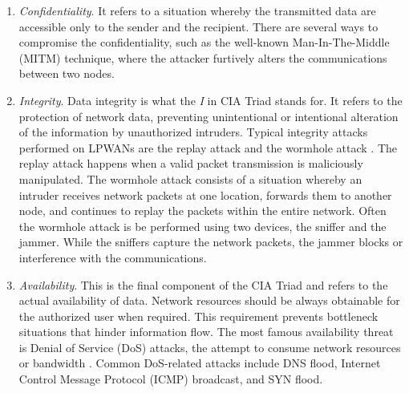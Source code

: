 \begin{enumerate}
	\item \textit{Confidentiality}. It refers to a situation whereby the transmitted data are accessible only to the sender and the recipient. There are several ways to compromise the confidentiality, such as the well-known Man-In-The-Middle (MITM) technique, where the attacker furtively alters the communications between two nodes.
	\item \textit{Integrity}. Data integrity is what the \textit{I} in CIA Triad stands for. It refers to the protection of network data, preventing unintentional or intentional alteration of the information by unauthorized intruders. Typical integrity attacks performed on LPWANs are the replay attack and the wormhole attack \cite{Chacko_2018}. The replay attack happens when a valid packet transmission is maliciously manipulated. The wormhole attack consists of a situation whereby an intruder receives network packets at one location, forwards them to another node, and continues to replay the packets within the entire network. Often the wormhole attack is be performed using two devices, the sniffer and the jammer. While the sniffers capture the network packets, the jammer blocks or interference with the communications.
	\item \textit{Availability}. This is the final component of the CIA Triad and refers to the actual availability of data. Network resources should be always obtainable for the authorized user when required. This requirement prevents bottleneck situations that hinder information flow. The most famous availability threat is Denial of Service (DoS) attacks, the attempt to consume network resources or bandwidth \cite{Al-Hadhrami2021}. Common DoS-related attacks include DNS flood, Internet Control Message Protocol (ICMP) broadcast, and SYN flood.
\end{enumerate}

 

